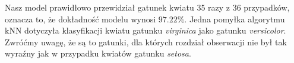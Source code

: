 \documentclass[a4paper]{article}
\begin{document}
Nasz model prawidłowo przewidział gatunek kwiatu 35 razy z 36 przypadków, oznacza to, że dokładność modelu wynosi $97.22\%$. Jedna pomyłka algorytmu kNN dotyczyła klasyfikacji kwiatu gatunku \textit{virginica} jako gatunku \textit{versicolor}. Zwróćmy uwagę, że są to gatunki, dla których rozdział obserwacji nie był tak wyraźny jak w przypadku kwiatów gatunku \textit{setosa}.
\end{document}
